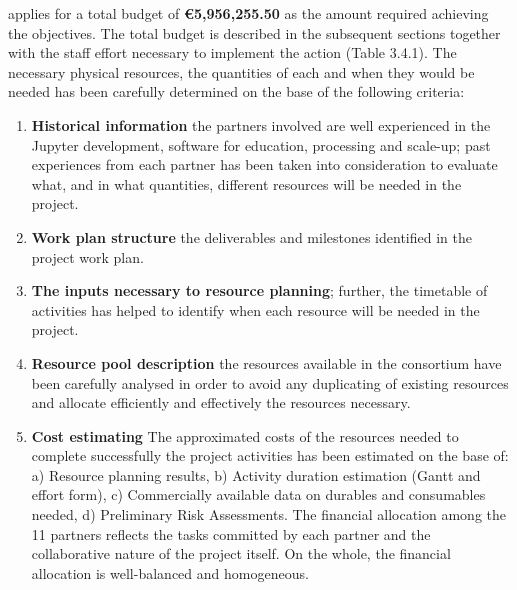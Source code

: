 %
%
\TheProject applies for a total budget of \textbf{\euro 5,956,255.50} as the amount
required achieving the objectives. The total budget is described in the subsequent
sections together with the staff effort necessary to implement the action (Table 3.4.1).
The necessary physical resources, the quantities of each and when they would be
needed has been carefully determined on the base of the following criteria:

\begin{enumerate}

\item \textbf{Historical information} the partners involved are well experienced in the
Jupyter development, software for education, processing and scale-up; past experiences
from each partner has been taken into consideration to evaluate what, and in what
quantities, different resources will be needed in the project.
\item \textbf{Work plan structure} the deliverables and milestones identified in the project work plan.
\item \textbf{The inputs necessary to resource planning}; further, the timetable of activities has helped to identify when each resource will be needed in the project.
\item \textbf{Resource pool description} the resources available in the consortium have
been carefully analysed in order to avoid any duplicating of existing resources
and allocate efficiently and effectively the resources necessary.
\item \textbf{Cost estimating}  The approximated costs of the resources needed to
complete successfully the project activities has been estimated on the base
of: a) Resource planning results, b) Activity duration estimation (Gantt and effort form),
c) Commercially available data on durables and consumables needed,
d) Preliminary Risk Assessments.
The financial allocation among the 11 partners reflects the tasks committed by each partner
and the collaborative nature of the project itself. On the whole, the financial allocation is
well-balanced and homogeneous.
\end{enumerate}

